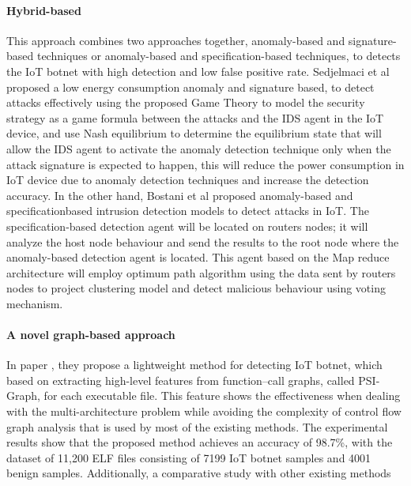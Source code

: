 \documentclass[conference]{IEEEtran}
\begin{document}
\paragraph{\textbf{Hybrid-based}}

This approach combines two approaches together, anomaly-based and signature-based techniques or
anomaly-based and specification-based techniques, to detects the IoT botnet with high detection and low false
positive rate. Sedjelmaci et al proposed a low energy consumption anomaly and signature based, to detect
attacks effectively using the proposed Game Theory to model the security strategy as a game formula between
the attacks and the IDS agent in the IoT device, and use Nash equilibrium to determine the equilibrium state that
will allow the IDS agent to activate the anomaly detection technique only when the attack signature is expected
to happen, this will reduce the power consumption in IoT device due to anomaly detection techniques and
increase the detection accuracy. In the other hand, Bostani et al proposed anomaly-based and specificationbased
intrusion detection models to detect attacks in IoT. The specification-based detection agent will be
located on routers nodes; it will analyze the host node behaviour and send the results to the root node where
the anomaly-based detection agent is located. This agent based on the Map reduce architecture will employ
optimum path algorithm using the data sent by routers nodes to project clustering model and detect malicious
behaviour using voting mechanism. \cite{b4}
\paragraph{\textbf{A novel graph-based approach}}

 In  paper \cite{b5}, they propose a lightweight method for detecting IoT
botnet, which based on extracting high-level features from function–call graphs, called PSI-Graph, for each executable file.
This feature shows the effectiveness when dealing with the multi-architecture problem while avoiding the complexity of
control flow graph analysis that is used by most of the existing methods. The experimental results show that the proposed
method achieves an accuracy of 98.7\%, with the dataset of 11,200 ELF files consisting of 7199 IoT botnet samples and 4001
benign samples. Additionally, a comparative study with other existing methods\cite{b5}
\end{document}
